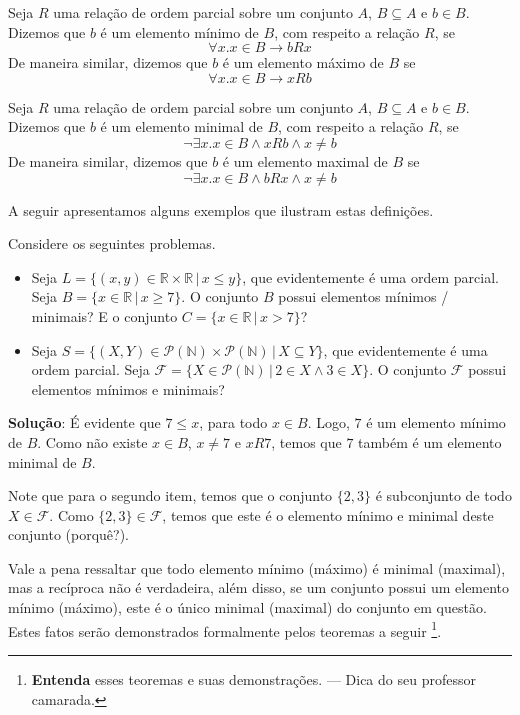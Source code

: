 \begin{Definition}
Seja $R$ uma relação de ordem parcial sobre um conjunto $A$,
$B\subseteq A$ e $b \in B$. Dizemos que $b$ é um elemento mínimo de
$B$, com respeito a relação $R$, se
\[
\forall x. x\in B \to b R x
\]
De maneira similar, dizemos que $b$ é um elemento máximo de $B$ se
\[
\forall x. x \in B \to x R b
\]
\end{Definition}

\begin{Definition}
Seja $R$ uma relação de ordem parcial sobre um conjunto $A$,
$B\subseteq A$ e $b \in B$. Dizemos que $b$ é um elemento minimal de
$B$, com respeito a relação $R$, se
\[
\neg \exists x. x\in B \land x R b \land x \neq b
\]
De maneira similar, dizemos que $b$ é um elemento maximal de $B$ se
\[
\neg \exists x. x\in B \land b R x \land x \neq b
\]
\end{Definition}
A seguir apresentamos alguns exemplos que ilustram estas definições.
\begin{Example}
Considere os seguintes problemas.
\begin{itemize}
  \item Seja $L =\{(x,y)\in\mathbb{R}\times\mathbb{R}\,|\, x \leq
    y\}$, que evidentemente é uma ordem parcial.  Seja $B = \{x \in
    \mathbb{R}\,|\,x \geq 7\}$. O conjunto $B$ possui elementos
    mínimos / minimais? E o conjunto $C =\{x\in\mathbb{R}\,|\,x >
    7\}$?
    \item Seja $S
      =\{(X,Y)\in\mathcal{P}(\mathbb{N})\times\mathcal{P}(\mathbb{N})\,|\,X
      \subseteq Y\}$, que evidentemente é uma ordem parcial. Seja
      $\mathcal{F}=\{X\in\mathcal{P}(\mathbb{N})\,|\,2\in X \land 3
      \in X\}$. O conjunto $\mathcal{F}$ possui elementos mínimos e minimais?
\end{itemize}
\textbf{Solução}: É evidente que $7 \leq x$, para todo $x \in
B$. Logo, $7$ é um elemento mínimo de $B$. Como não existe $x \in B$,
$x\neq 7$ e $x R 7$, temos que $7$ também é um elemento minimal de
$B$.

Note que para o segundo item, temos que o conjunto $\{2,3\}$ é
subconjunto de todo $X\in\mathcal{F}$. Como $\{2,3\}\in\mathcal{F}$,
temos que este é o elemento mínimo e minimal deste conjunto (porquê?).
\end{Example}

Vale a pena ressaltar que todo elemento mínimo (máximo) é minimal
(maximal), mas a recíproca não é verdadeira, além disso, se um
conjunto possui um elemento mínimo (máximo), este é o único minimal
(maximal) do conjunto em questão. Estes fatos serão demonstrados
formalmente pelos teoremas a seguir \footnote{\textbf{Entenda} esses
  teoremas e suas demonstrações. --- Dica do seu professor camarada.}.


